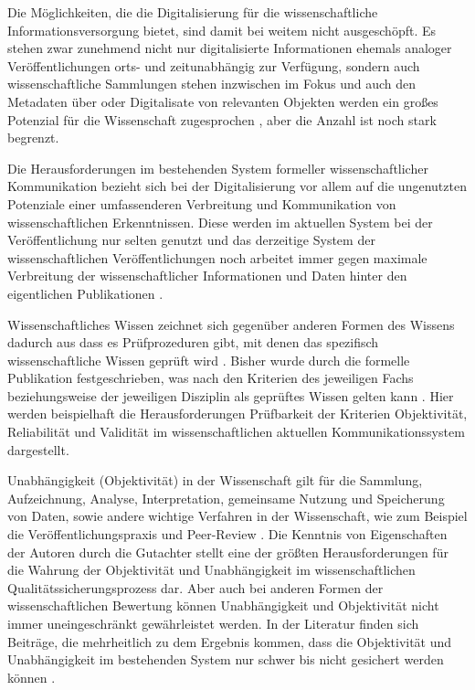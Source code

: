 Die Möglichkeiten, die die Digitalisierung für die wissenschaftliche Informationsversorgung bietet, sind damit bei weitem nicht ausgeschöpft. Es stehen zwar zunehmend nicht nur digitalisierte Informationen ehemals analoger Veröffentlichungen orts- und zeitunabhängig zur Verfügung, sondern auch wissenschaftliche Sammlungen stehen inzwischen im Fokus und auch den Metadaten über oder Digitalisate von relevanten Objekten werden ein großes Potenzial für die Wissenschaft zugesprochen \cite{winkler_2011_anforderungen}, aber die Anzahl ist noch stark begrenzt.

Die Herausforderungen im bestehenden System formeller wissenschaftlicher Kommunikation bezieht sich bei der Digitalisierung vor allem auf die ungenutzten Potenziale einer umfassenderen Verbreitung und Kommunikation von wissenschaftlichen Erkenntnissen. Diese werden im aktuellen System bei der Veröffentlichung nur selten genutzt und das derzeitige System der wissenschaftlichen Veröffentlichungen noch arbeitet immer gegen maximale Verbreitung der wissenschaftlicher Informationen und Daten hinter den eigentlichen Publikationen \cite{Molloy_2011}.


Wissenschaftliches Wissen zeichnet sich gegenüber anderen Formen des Wissens dadurch aus dass es Prüfprozeduren gibt, mit denen das spezifisch wissenschaftliche Wissen geprüft wird \cite{Luhmann1998}. Bisher wurde durch die formelle Publikation festgeschrieben, was nach den Kriterien des jeweiligen Fachs beziehungsweise der jeweiligen Disziplin als geprüftes Wissen gelten kann \cite[:11]{bbaw_publizieren_2015}. Hier werden beispielhaft die Herausforderungen Prüfbarkeit der Kriterien Objektivität, Reliabilität und Validität im wissenschaftlichen aktuellen Kommunikationssystem dargestellt.

Unabhängigkeit (Objektivität) in der Wissenschaft gilt für die Sammlung, Aufzeichnung, Analyse, Interpretation, gemeinsame Nutzung und Speicherung von Daten, sowie andere wichtige Verfahren in der Wissenschaft, wie zum Beispiel die Veröffentlichungspraxis und Peer-Review \cite{resnik_2005_ethics}. Die Kenntnis von Eigenschaften der Autoren durch die Gutachter stellt eine der größten Herausforderungen für die Wahrung der Objektivität und Unabhängigkeit im wissenschaftlichen Qualitätssicherungsprozess dar. Aber auch bei anderen Formen der wissenschaftlichen Bewertung können Unabhängigkeit und Objektivität nicht immer uneingeschränkt gewährleistet werden. In der Literatur finden sich Beiträge, die mehrheitlich zu dem Ergebnis kommen, dass die Objektivität und Unabhängigkeit im bestehenden System nur schwer bis nicht gesichert werden können \cite{binswanger_2014_excellence}.

